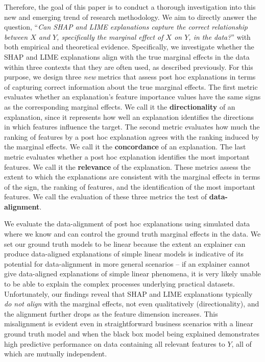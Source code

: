 \documentclass[mnsc,blindrev]{informs3}
\begin{document}
Therefore, the goal of this paper is to conduct a thorough investigation into this new and emerging trend of research methodology. We aim to directly answer the question, 
``\emph{Can SHAP and LIME explanations capture the correct relationship between $X$ and $Y$, specifically the marginal effect of $X$ on $Y$, in the data?}''
with both empirical and theoretical evidence.  Specifically, we investigate whether the SHAP and LIME explanations align with the true marginal effects in the data within three contexts that they are often used, as described previously. For this purpose, we design three \textit{new} metrics that assess post hoc explanations in terms of capturing correct information about the true marginal effects. The first metric evaluates whether an explanation's feature importance values have the same signs as the corresponding marginal effects. We call it the \textbf{directionality} of an explanation, since it represents how well an explanation identifies the directions in which features influence the target. The second metric evaluates how much the ranking of features by a post hoc explanation agrees with the ranking induced by the marginal effects. We call it the \textbf{concordance} of an explanation. The last metric evaluates whether a post hoc explanation identifies the most important features. We call it the \textbf{relevance} of the explanation. These metrics assess the extent to which the explanations are consistent with the marginal effects in terms of the sign, the ranking of features, and the identification of the most important features. We call the evaluation of these three metrics the test of \textbf{data-alignment}.

We evaluate the data-alignment of post hoc explanations using simulated data where we know and can control the ground truth marginal effects in the data. We set our ground truth models to be linear because the extent an explainer can produce data-aligned explanations of simple linear models is  indicative of its potential for data-alignment in more general scenarios -- if an explainer cannot give data-aligned explanations of simple linear phenomena, it is very likely unable to be able to explain the complex processes underlying practical datasets. Unfortunately, our findings reveal that SHAP and LIME explanations typically \textit{do not align} with the marginal effects, not even qualitatively (directionality), and the alignment further drops as the feature dimension increases. This misalignment is evident even in straightforward business scenarios with a linear ground truth model and when the black box model being explained demonstrates high predictive performance on data containing all relevant features to $Y$, all of which are mutually independent. 
\end{document}

